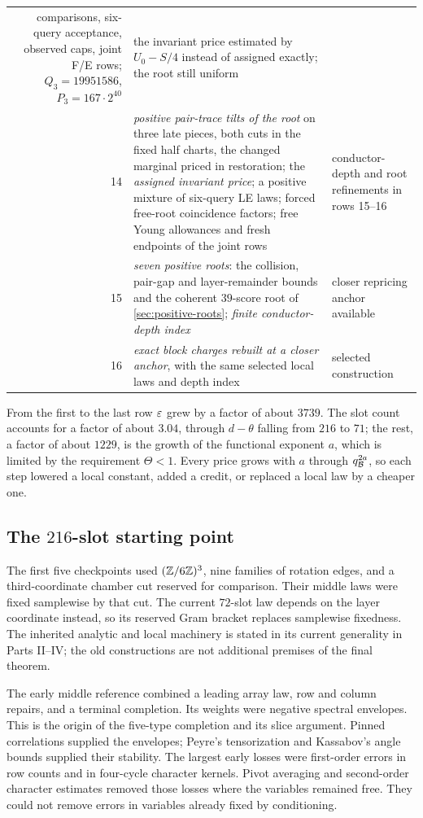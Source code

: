 {\begin{longtable}{@{}r>{\raggedright\arraybackslash}p{}>{\raggedright\arraybackslash}p{}@{}}
 comparisons, six-query acceptance, observed caps, joint F/E rows;
 $Q_3=19951586$, $P_3=167\cdot2^{40}$ &
 the invariant price estimated by $U_0-S/4$ instead of assigned exactly; the root still uniform\\
14 & \emph{positive pair-trace tilts of the root} on three late pieces, both
 cuts in the fixed half charts, the changed marginal priced in restoration;
 the \emph{assigned invariant price}; a positive mixture of six-query LE laws;
 forced free-root coincidence factors; free Young allowances and fresh
 endpoints of the joint rows & conductor-depth and root refinements in
 rows 15--16\\
15 & \emph{seven positive roots}: the collision, pair-gap and layer-remainder bounds and the coherent $39$-score root of \cref{sec:positive-roots};
 \emph{finite conductor-depth index} & closer repricing anchor available\\
16 & \emph{exact block charges rebuilt at a closer anchor}, with the same
 selected local laws and depth index & selected construction\\
\end{longtable}
}

From the first to the last row $\varepsilon$ grew by a factor of about $3739$. The
slot count accounts for a factor of about $3.04$, through $d-\theta$ falling
from $216$ to $71$; the rest, a factor of about $1229$, is the growth of the
functional exponent $a$, which is limited by the requirement $\Theta<1$.
Every price grows with $a$ through $q_{\mathcal B}^{2a}$, so each step lowered a
local constant, added a credit, or replaced a local law by a cheaper one.

\subsection{The \texorpdfstring{$216$}{216}-slot starting point}\label{subsec:history:216}

The first five checkpoints used $(\mathbb Z/6\mathbb Z)^3$, nine families of
rotation edges, and a third-coordinate chamber cut reserved for
comparison. Their middle laws were fixed samplewise by that cut.
The current $72$-slot law depends on the layer coordinate instead,
so its reserved Gram bracket replaces samplewise fixedness.
The inherited analytic and local machinery is stated in its current
generality in Parts II--IV; the old constructions are not additional
premises of the final theorem.

The early middle reference combined a leading array law, row and
column repairs, and a terminal completion. Its weights were negative
spectral envelopes. This is the origin of the five-type completion
and its slice argument. Pinned correlations supplied the envelopes;
Peyre's tensorization and Kassabov's angle bounds supplied their
stability. The largest early losses were first-order errors in row
counts and in four-cycle character kernels. Pivot averaging and
second-order character estimates removed those losses where the
variables remained free. They could not remove errors in variables
already fixed by conditioning.

